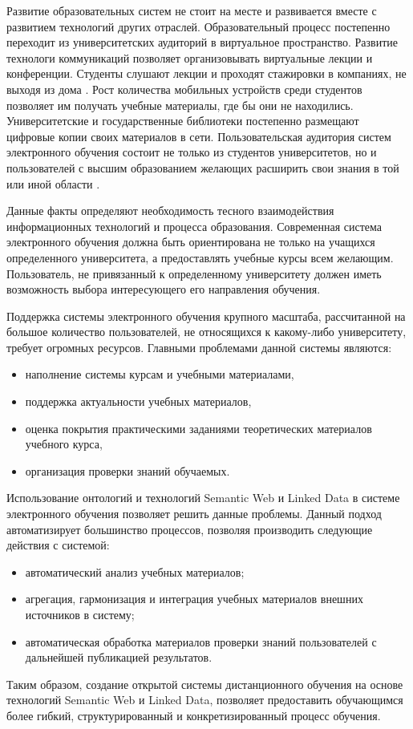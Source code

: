Развитие образовательных систем не стоит на месте и развивается вместе с развитием технологий других отраслей. Образовательный процесс постепенно переходит из университетских аудиторий в виртуальное пространство. Развитие технологи коммуникаций позволяет организовывать виртуальные лекции и конференции. Студенты слушают лекции и проходят стажировки в компаниях, не выходя из дома \cite{masie2012connecting}. Рост количества мобильных устройств среди студентов позволяет им получать учебные материалы, где бы они не находились. Университетские и государственные библиотеки постепенно размещают цифровые копии своих материалов в сети. Пользовательская аудитория систем электронного обучения состоит не только из студентов университетов, но и пользователей с высшим образованием желающих расширить свои знания в той или иной области \cite{oblinger2010campus}. 

Данные факты определяют необходимость тесного взаимодействия информационных технологий и процесса образования. Современная система электронного обучения должна быть ориентирована не только на учащихся определенного университета, а предоставлять учебные курсы всем желающим. Пользователь, не привязанный к определенному университету должен иметь возможность выбора интересующего его направления обучения. 

Поддержка системы электронного обучения крупного масштаба, рассчитанной на большое количество пользователей, не относящихся к какому-либо университету, требует огромных ресурсов. Главными проблемами данной системы являются: 

\begin{itemize}
\item наполнение системы курсам и учебными материалами,
\item поддержка актуальности учебных материалов, 
\item оценка покрытия практическими заданиями теоретических материалов учебного курса,
\item организация проверки знаний обучаемых.
\end{itemize}

Использование онтологий и технологий Semantic Web и Linked Data в системе электронного обучения позволяет решить данные проблемы. Данный подход автоматизирует большинство процессов, позволяя производить следующие действия с системой:

\begin{itemize}
\item автоматический анализ учебных материалов;
\item агрегация, гармонизация и интеграция учебных материалов внешних источников в систему;
\item автоматическая обработка материалов проверки знаний пользователей с дальнейшей публикацией результатов. 
\end{itemize}

Таким образом, создание открытой системы дистанционного обучения на основе технологий Semantic Web и Linked Data, позволяет предоставить обучающимся более гибкий, структурированный и конкретизированный процесс обучения. 


\clearpage
